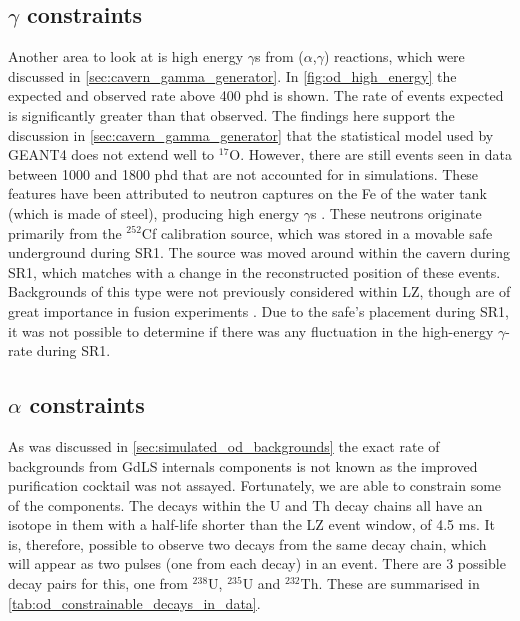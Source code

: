 \subsection{$\gamma$ constraints}
\par
Another area to look at is high energy $\gamma$s from ($\alpha$,$\gamma$) reactions, which were discussed in \autoref{sec:cavern_gamma_generator}.
In \autoref{fig:od_high_energy} the expected and observed rate above 400 phd is shown.
The rate of events expected is significantly greater than that observed.
The findings here support the discussion in \autoref{sec:cavern_gamma_generator} that the statistical model used by GEANT4 does not extend well to ${}^{17}$O.
However, there are still events seen in data between 1000 and 1800 phd that are not accounted for in simulations.
These features have been attributed to neutron captures on the Fe of the water tank (which is made of steel), producing high energy $\gamma$s \cite{iron_neutrons_ref}.
These neutrons originate primarily from the ${}^{252}$Cf calibration source, which was stored in a movable safe underground during SR1.
The source was moved around within the cavern during SR1, which matches with a change in the reconstructed position of these events.
Backgrounds of this type were not previously considered within LZ, though are of great importance in fusion experiments \cite{iter_neutrons_ref}.
Due to the safe's placement during SR1, it was not possible to determine if there was any fluctuation in the high-energy $\gamma$-rate during SR1.



\subsection{$\alpha$ constraints}
\par
As was discussed in \autoref{sec:simulated_od_backgrounds} the exact rate of backgrounds from GdLS internals components is not known as the improved purification cocktail was not assayed.
Fortunately, we are able to constrain some of the components. 
The decays within the U and Th decay chains all have an isotope in them with a half-life shorter than the LZ event window, of 4.5 ms.
It is, therefore, possible to observe two decays from the same decay chain, which will appear as two pulses (one from each decay) in an event.
There are 3 possible decay pairs for this, one from ${}^{238}$U, ${}^{235}$U and ${}^{232}$Th.
These are summarised in \autoref{tab:od_constrainable_decays_in_data}.

